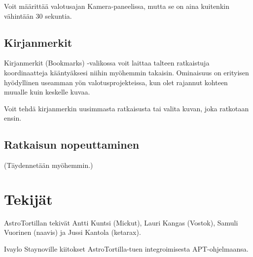 \documentclass{article}
\begin{document}
Voit määrittää valotusajan Kamera-paneelissa, mutta se on aina kuitenkin vähintään 30 sekuntia.

\subsection{Kirjanmerkit}

Kirjanmerkit (Bookmarks) -valikossa voit laittaa talteen ratkaistuja koordinaatteja kääntyäksesi niihin myöhemmin takaisin.
Ominaisuus on erityisen hyödyllinen useamman yön valotusprojekteissa, kun olet rajannut kohteen muualle kuin keskelle kuvaa.

Voit tehdä kirjanmerkin uusimmasta ratkaisusta tai valita kuvan, joka ratkotaan ensin.

\subsection{Ratkaisun nopeuttaminen}

(Täydennetään myöhemmin.)

\section{Tekijät}

AstroTortillan tekivät Antti Kuntsi (Mickut), Lauri Kangas (Vostok), Samuli Vuorinen (naavis) ja Jussi Kantola (ketarax).

Ivaylo Staynoville kiitokset AstroTortilla-tuen integroimisesta APT-ohjelmaansa.
\end{document}
